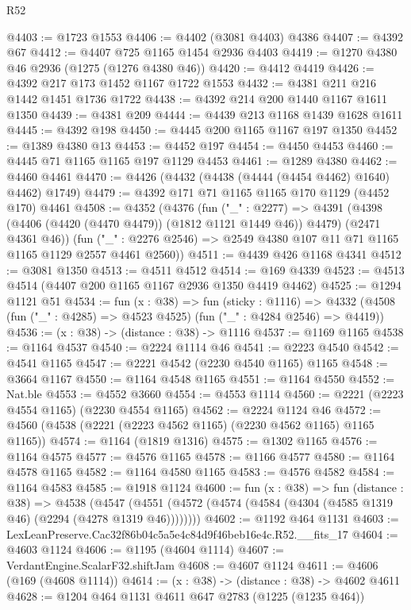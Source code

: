 \begin{lexlean}{R52}
\begin{coremodule}
@4403 := @1723 @1553
@4406 := @4402 (@3081 @4403) @4386
@4407 := @4392 @67
@4412 := @4407 @725 @1165 @1454 @2936 @4403
@4419 := @1270 @4380 @46 @2936 (@1275 (@1276 @4380 @46))
@4420 := @4412 @4419
@4426 := @4392 @217 @173 @1452 @1167 @1722 @1553
@4432 := @4381 @211 @216 @1442 @1451 @1736 @1722
@4438 := @4392 @214 @200 @1440 @1167 @1611 @1350
@4439 := @4381 @209
@4444 := @4439 @213 @1168 @1439 @1628 @1611
@4445 := @4392 @198
@4450 := @4445 @200 @1165 @1167 @197 @1350
@4452 := @1389 @4380 @13
@4453 := @4452 @197
@4454 := @4450 @4453
@4460 := @4445 @71 @1165 @1165 @197 @1129 @4453
@4461 := @1289 @4380
@4462 := @4460 @4461
@4470 := @4426 (@4432 (@4438 (@4444 (@4454 @4462) @1640) @4462) @1749)
@4479 := @4392 @171 @71 @1165 @1165 @170 @1129 (@4452 @170) @4461
@4508 := @4352
    (@4376
      (fun ("_" : @2277) =>
      @4391 (@4398 (@4406 (@4420 (@4470 @4479)) (@1812 @1121 @1449 @46)) @4479) (@2471 @4361 @46))
      (fun ("_" : @2276 @2546) => @2549 @4380 @107 @11 @71 @1165 @1165 @1129 @2557 @4461 @2560))
@4511 := @4439 @426 @1168 @4341
@4512 := @3081 @1350
@4513 := @4511 @4512
@4514 := @169 @4339
@4523 := @4513 @4514 (@4407 @200 @1165 @1167 @2936 @1350 @4419 @4462)
@4525 := @1294 @1121 @51
@4534 := fun (x : @38) =>
  fun (sticky : @1116) =>
  @4332 (@4508 (fun ("_" : @4285) => @4523 @4525) (fun ("_" : @4284 @2546) => @4419))
@4536 := (x : @38) -> (distance : @38) -> @1116
@4537 := @1169 @1165
@4538 := @1164 @4537
@4540 := @2224 @1114 @46
@4541 := @2223 @4540
@4542 := @4541 @1165
@4547 := @2221 @4542 (@2230 @4540 @1165) @1165
@4548 := @3664 @1167
@4550 := @1164 @4548 @1165
@4551 := @1164 @4550
@4552 := Nat.ble
@4553 := @4552 @3660
@4554 := @4553 @1114
@4560 := @2221 (@2223 @4554 @1165) (@2230 @4554 @1165)
@4562 := @2224 @1124 @46
@4572 := @4560 (@4538 (@2221 (@2223 @4562 @1165) (@2230 @4562 @1165) @1165 @1165))
@4574 := @1164 (@1819 @1316)
@4575 := @1302 @1165
@4576 := @1164 @4575
@4577 := @4576 @1165
@4578 := @1166 @4577
@4580 := @1164 @4578 @1165
@4582 := @1164 @4580 @1165
@4583 := @4576 @4582
@4584 := @1164 @4583
@4585 := @1918 @1124
@4600 := fun (x : @38) =>
  fun (distance : @38) =>
  @4538 (@4547 (@4551 (@4572 (@4574 (@4584 (@4304 (@4585 @1319 @46) (@2294 (@4278 @1319 @46))))))))
@4602 := @1192 @464 @1131
@4603 := LexLeanPreserve.Cac32f86b04c5a5e4c84d9f46beb16e4c.R52.__fits_17
@4604 := @4603 @1124
@4606 := @1195 (@4604 @1114)
@4607 := VerdantEngine.ScalarF32.shiftJam
@4608 := @4607 @1124
@4611 := @4606 (@169 (@4608 @1114))
@4614 := (x : @38) -> (distance : @38) -> @4602 @4611
@4628 := @1204
    @464
    @1131
    @4611
    @647
    @2783
    (@1225 (@1235 @464))

\end{coremodule}
\end{lexlean}
